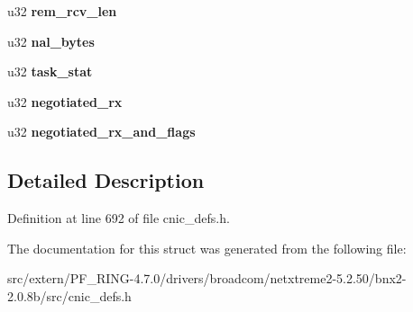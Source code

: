 \begin{DoxyCompactItemize}
\item 
\hypertarget{structustorm__iscsi__st__context_abd8b934b9e813a60733dfa7bb34739c6}{
u32 {\bfseries rem\_\-rcv\_\-len}}
\label{structustorm__iscsi__st__context_abd8b934b9e813a60733dfa7bb34739c6}

\item 
\hypertarget{structustorm__iscsi__st__context_a38b79822af037ee5513bc33991b97d87}{
u32 {\bfseries nal\_\-bytes}}
\label{structustorm__iscsi__st__context_a38b79822af037ee5513bc33991b97d87}

\item 
\hypertarget{structustorm__iscsi__st__context_a95132cf62d6ede042a80d31ff05c12c9}{
u32 {\bfseries task\_\-stat}}
\label{structustorm__iscsi__st__context_a95132cf62d6ede042a80d31ff05c12c9}

\item 
\hypertarget{structustorm__iscsi__st__context_a4521ae7ad5fa5c62615c5fdbc1d580b5}{
u32 {\bfseries negotiated\_\-rx}}
\label{structustorm__iscsi__st__context_a4521ae7ad5fa5c62615c5fdbc1d580b5}

\item 
\hypertarget{structustorm__iscsi__st__context_a2cdb33b51a84d900b2e52399c262b50f}{
u32 {\bfseries negotiated\_\-rx\_\-and\_\-flags}}
\label{structustorm__iscsi__st__context_a2cdb33b51a84d900b2e52399c262b50f}

\end{DoxyCompactItemize}


\subsection{Detailed Description}


Definition at line 692 of file cnic\_\-defs.h.



The documentation for this struct was generated from the following file:\begin{DoxyCompactItemize}
\item 
src/extern/PF\_\-RING-\/4.7.0/drivers/broadcom/netxtreme2-\/5.2.50/bnx2-\/2.0.8b/src/cnic\_\-defs.h\end{DoxyCompactItemize}
